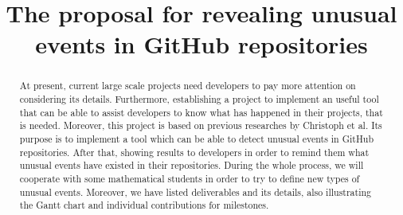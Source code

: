 \documentclass[conference]{IEEEtran}
\begin{document}
\title{The proposal for revealing unusual events in GitHub repositories}


\author{
\and
{}
\and
{}
}


\maketitle


\begin{abstract}

At present, current large scale projects need developers to pay more attention on considering its details. Furthermore, establishing a project to implement an useful tool that can be able to assist developers to know what has happened in their projects, that is needed. Moreover, this project is based on previous researches by Christoph et al. Its purpose is to implement a tool which can be able to detect unusual events in GitHub repositories. After that, showing results to developers in order to remind them what unusual events have existed in their repositories. During the whole process, we will cooperate with some mathematical students in order to try to define new types of unusual events. Moreover, we have listed deliverables and its details, also illustrating the Gantt chart and individual contributions for milestones.
\end{abstract}
\end{document}
